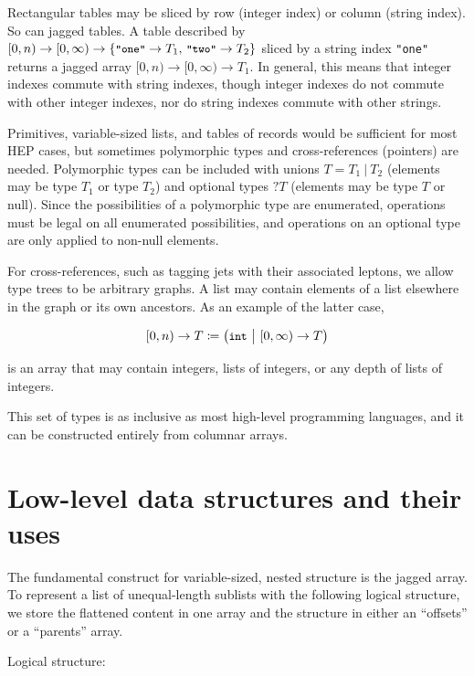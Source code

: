 \documentclass{webofc}
\begin{document}
Rectangular tables may be sliced by row (integer index) or column (string index). So can jagged tables. A table described by $[0, n) \to [0, \infty) \to \{\mbox{\small\tt "one"} \to T_1\mbox{, }\mbox{\small\tt "two"} \to T_2\}$ sliced by a string index {\small\tt "one"} returns a jagged array $[0, n) \to [0, \infty) \to T_1$. In general, this means that integer indexes commute with string indexes, though integer indexes do not commute with other integer indexes, nor do string indexes commute with other strings.

Primitives, variable-sized lists, and tables of records would be sufficient for most HEP cases, but sometimes polymorphic types and cross-references (pointers) are needed. Polymorphic types can be included with unions $T = T_1\ |\ T_2$ (elements may be type $T_1$ or type $T_2$) and optional types $?T$ (elements may be type $T$ or null). Since the possibilities of a polymorphic type are enumerated, operations must be legal on all enumerated possibilities, and operations on an optional type are only applied to non-null elements.

For cross-references, such as tagging jets with their associated leptons, we allow type trees to be arbitrary graphs. A list may contain elements of a list elsewhere in the graph or its own ancestors. As an example of the latter case,

\[ [0, n) \to T \coloneqq \big( \mbox{\small\tt int}\ \big|\ [0, \infty) \to T \big) \]

\noindent is an array that may contain integers, lists of integers, or any depth of lists of integers.

This set of types is as inclusive as most high-level programming languages, and it can be constructed entirely from columnar arrays.

\section{Low-level data structures and their uses}

The fundamental construct for variable-sized, nested structure is the jagged array. To represent a list of unequal-length sublists with the following logical structure, we store the flattened content in one array and the structure in either an ``offsets'' or a ``parents'' array.

\vspace{\baselineskip}
Logical structure: \tabto{4 cm}{\ttfamily\textcolor{black}{[\textcolor{red}{[}\textcolor{darkblue}{0, 1, 2}], \textcolor{red}{[}], \textcolor{red}{[}\textcolor{darkblue}{3, 4}], \textcolor{red}{[}\textcolor{darkblue}{5, 6, 7, 8}], \textcolor{red}{[}]\ \ \textcolor{red}{]}}}
\end{document}
